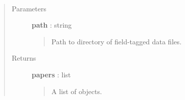 \documentclass[letterpaper,10pt,english]{sphinxmanual}
\begin{document}

\begin{fulllineitems}
\label{tethne.readers.wos:tethne.readers.wos.corpus_from_dir}~\begin{quote}\begin{description}
\item[{Parameters}] \leavevmode
\textbf{path} : string
\begin{quote}

Path to directory of field-tagged data files.
\end{quote}

\item[{Returns}] \leavevmode
\textbf{papers} : list
\begin{quote}

A list of {\hyperref[tethne.classes.paper:tethne.classes.paper.Paper]{}} objects.
\end{quote}

\end{description}\end{quote}

\end{fulllineitems}

\end{document}
